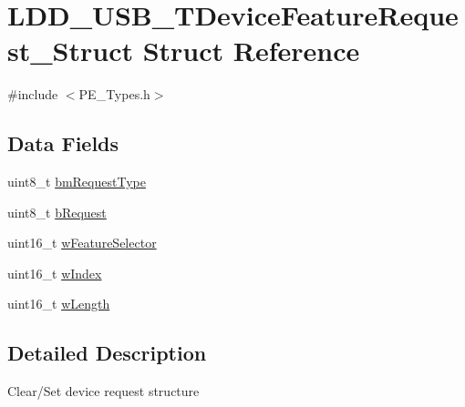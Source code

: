 \hypertarget{struct_l_d_d___u_s_b___t_device_feature_request___struct}{\section{L\-D\-D\-\_\-\-U\-S\-B\-\_\-\-T\-Device\-Feature\-Request\-\_\-\-Struct Struct Reference}
\label{struct_l_d_d___u_s_b___t_device_feature_request___struct}
}


{\ttfamily \#include $<$P\-E\-\_\-\-Types.\-h$>$}

\subsection*{Data Fields}
\begin{DoxyCompactItemize}
\item 
uint8\-\_\-t \hyperlink{struct_l_d_d___u_s_b___t_device_feature_request___struct_a8258c0deaca59b3bd0c4d39c0dca9637}{bm\-Request\-Type}
\item 
uint8\-\_\-t \hyperlink{struct_l_d_d___u_s_b___t_device_feature_request___struct_a7dbfead1667063e1e2e7fb608362606a}{b\-Request}
\item 
uint16\-\_\-t \hyperlink{struct_l_d_d___u_s_b___t_device_feature_request___struct_a74dbb226786321c02ccad64b067b4ebe}{w\-Feature\-Selector}
\item 
uint16\-\_\-t \hyperlink{struct_l_d_d___u_s_b___t_device_feature_request___struct_a261267b70741fe26898665df42fec10b}{w\-Index}
\item 
uint16\-\_\-t \hyperlink{struct_l_d_d___u_s_b___t_device_feature_request___struct_af0c222aa4585a132b2582fb1c290edc7}{w\-Length}
\end{DoxyCompactItemize}


\subsection{Detailed Description}
Clear/\-Set device request structure 

